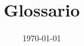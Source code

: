 \documentclass[openany,12pt,a4paper]{report}
\title{Glossario}
\author{}
\date{\today}
\begin{document}
	
	\printglossaries
	
\end{document}
